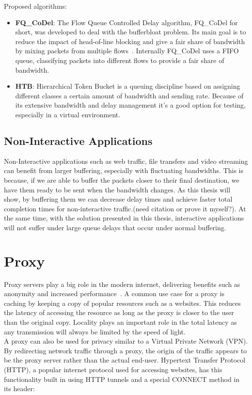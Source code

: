 \documentclass[a4paper,english, 11pt]{report}
\begin{document}
Proposed algorithms:
\begin{itemize}
  \item \textbf{FQ\_CoDel}: The Flow Queue Controlled Delay algorithm, FQ\_CoDel for short, was developed to deal with the bufferbloat problem. Its main goal is to reduce the impact of head-of-line blocking and give a fair share of bandwidth by mixing packets from multiple flows~\cite{fq_codel_rfc}. Internally FQ\_CoDel uses a FIFO queue, classifying packets into different flows to provide a fair share of bandwidth.
  \item \textbf{HTB}: Hierarchical Token Bucket is a queuing discipline based on assigning different classes a certain amount of bandwidth and sending rate. Because of its extensive bandwidth and delay management it's a good option for testing, especially in a virtual environment.
\end{itemize}

\subsection{Non-Interactive Applications}
Non-Interactive applications such as web traffic, file transfers and video streaming can benefit from larger buffering, especially with fluctuating bandwidths. This is because, if we are able to buffer the packets closer to their final destination, we have them ready to be sent when the bandwidth changes. As this thesis will show, by buffering them we can decrease delay times and achieve faster total completion times for non-interactive traffic.(need citation or prove it myself?). At the same time, with the solution presented in this thesis, interactive applications will not suffer under large queue delays that occur under normal buffering.

\section{Proxy}
Proxy servers play a big role in the modern internet, delivering benefits such as anonymity and increased performance~\cite{nextgen_proxy_servers}. A common use case for a proxy is caching by keeping a copy of popular resources such as a websites. This reduces the latency of accessing the resource as long as the proxy is closer to the user than the original copy. Locality plays an important role in the total latency as any transmission will always be limited by the speed of light.\\

A proxy can also be used for privacy similar to a Virtual Private Network (VPN). By redirecting network traffic through a proxy, the origin of the traffic appears to be the proxy server rather than the actual end-user. Hypertext Transfer Protocol (HTTP), a popular internet protocol used for accessing websites, has this functionality built in using HTTP tunnels and a special CONNECT method in its header:\\
\end{document}
